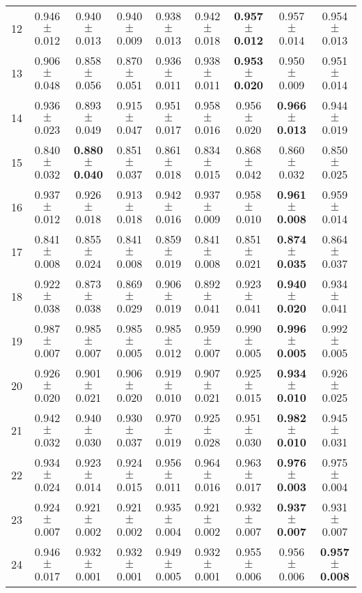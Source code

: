 \begin{table}[!ht]
{\begin{tabular}{r c c c c c c c c}
12 & 0.946 $\pm$ 0.012 & 0.940 $\pm$ 0.013 & 0.940 $\pm$ 0.009 & 0.938 $\pm$ 0.013 & 0.942 $\pm$ 0.018 & \textbf{0.957 $\pm$ 0.012} & 0.957 $\pm$ 0.014 & 0.954 $\pm$ 0.013 \\
13 & 0.906 $\pm$ 0.048 & 0.858 $\pm$ 0.056 & 0.870 $\pm$ 0.051 & 0.936 $\pm$ 0.011 & 0.938 $\pm$ 0.011 & \textbf{0.953 $\pm$ 0.020} & 0.950 $\pm$ 0.009 & 0.951 $\pm$ 0.014 \\
14 & 0.936 $\pm$ 0.023 & 0.893 $\pm$ 0.049 & 0.915 $\pm$ 0.047 & 0.951 $\pm$ 0.017 & 0.958 $\pm$ 0.016 & 0.956 $\pm$ 0.020 & \textbf{0.966 $\pm$ 0.013} & 0.944 $\pm$ 0.019 \\
15 & 0.840 $\pm$ 0.032 & \textbf{0.880 $\pm$ 0.040} & 0.851 $\pm$ 0.037 & 0.861 $\pm$ 0.018 & 0.834 $\pm$ 0.015 & 0.868 $\pm$ 0.042 & 0.860 $\pm$ 0.032 & 0.850 $\pm$ 0.025 \\
16 & 0.937 $\pm$ 0.012 & 0.926 $\pm$ 0.018 & 0.913 $\pm$ 0.018 & 0.942 $\pm$ 0.016 & 0.937 $\pm$ 0.009 & 0.958 $\pm$ 0.010 & \textbf{0.961 $\pm$ 0.008} & 0.959 $\pm$ 0.014 \\
17 & 0.841 $\pm$ 0.008 & 0.855 $\pm$ 0.024 & 0.841 $\pm$ 0.008 & 0.859 $\pm$ 0.019 & 0.841 $\pm$ 0.008 & 0.851 $\pm$ 0.021 & \textbf{0.874 $\pm$ 0.035} & 0.864 $\pm$ 0.037 \\
18 & 0.922 $\pm$ 0.038 & 0.873 $\pm$ 0.038 & 0.869 $\pm$ 0.029 & 0.906 $\pm$ 0.019 & 0.892 $\pm$ 0.041 & 0.923 $\pm$ 0.041 & \textbf{0.940 $\pm$ 0.020} & 0.934 $\pm$ 0.041 \\
19 & 0.987 $\pm$ 0.007 & 0.985 $\pm$ 0.007 & 0.985 $\pm$ 0.005 & 0.985 $\pm$ 0.012 & 0.959 $\pm$ 0.007 & 0.990 $\pm$ 0.005 & \textbf{0.996 $\pm$ 0.005} & 0.992 $\pm$ 0.005 \\
20 & 0.926 $\pm$ 0.020 & 0.901 $\pm$ 0.021 & 0.906 $\pm$ 0.020 & 0.919 $\pm$ 0.010 & 0.907 $\pm$ 0.021 & 0.925 $\pm$ 0.015 & \textbf{0.934 $\pm$ 0.010} & 0.926 $\pm$ 0.025 \\
21 & 0.942 $\pm$ 0.032 & 0.940 $\pm$ 0.030 & 0.930 $\pm$ 0.037 & 0.970 $\pm$ 0.019 & 0.925 $\pm$ 0.028 & 0.951 $\pm$ 0.030 & \textbf{0.982 $\pm$ 0.010} & 0.945 $\pm$ 0.031 \\
22 & 0.934 $\pm$ 0.024 & 0.923 $\pm$ 0.014 & 0.924 $\pm$ 0.015 & 0.956 $\pm$ 0.011 & 0.964 $\pm$ 0.016 & 0.963 $\pm$ 0.017 & \textbf{0.976 $\pm$ 0.003} & 0.975 $\pm$ 0.004 \\
23 & 0.924 $\pm$ 0.007 & 0.921 $\pm$ 0.002 & 0.921 $\pm$ 0.002 & 0.935 $\pm$ 0.004 & 0.921 $\pm$ 0.002 & 0.932 $\pm$ 0.007 & \textbf{0.937 $\pm$ 0.007} & 0.931 $\pm$ 0.007 \\
24 & 0.946 $\pm$ 0.017 & 0.932 $\pm$ 0.001 & 0.932 $\pm$ 0.001 & 0.949 $\pm$ 0.005 & 0.932 $\pm$ 0.001 & 0.955 $\pm$ 0.006 & 0.956 $\pm$ 0.006 & \textbf{0.957 $\pm$ 0.008} \\

\end{tabular}}
\end{table}
